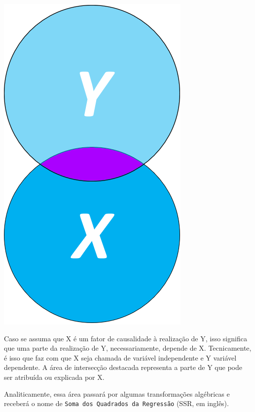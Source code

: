 \documentclass[
]{book}
\begin{document}
\includegraphics{./img/cap_reg_x_y2.png}

Caso se assuma que X é um fator de causalidade à realização de Y, isso significa que uma parte da realização de Y, necessariamente, depende de X. Tecnicamente, é isso que faz com que X seja chamada de variável independente e Y variável dependente. A área de intersecção destacada representa a parte de Y que pode ser atribuída ou explicada por X.

Analiticamente, essa área passará por algumas transformações algébricas e receberá o nome de \texttt{Soma\ dos\ Quadrados\ da\ Regressão} (SSR, em inglês).
\end{document}
